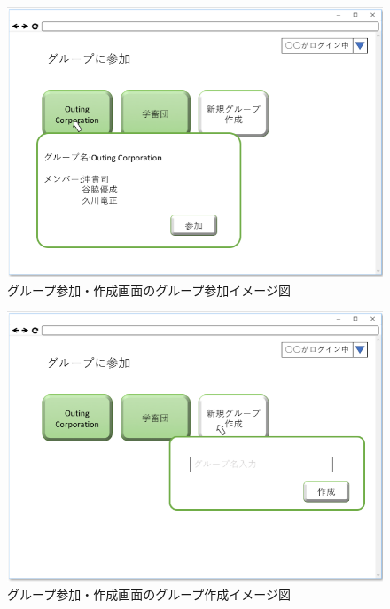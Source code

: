 \begin{figure}[htbp]
  \begin{center}
    \includegraphics[width=0.8\linewidth,clip]{./img/26.png}
    \caption{グループ参加・作成画面のグループ参加イメージ図}\label{fig:26}
  \end{center}
\end{figure}

\begin{figure}[htbp]
  \begin{center}
    \includegraphics[width=0.8\linewidth,clip]{./img/27.png}
    \caption{グループ参加・作成画面のグループ作成イメージ図}\label{fig:27}
  \end{center}
\end{figure}


